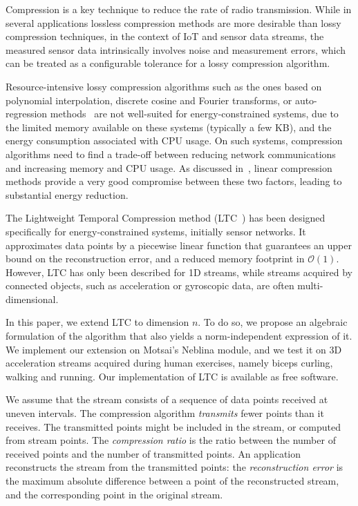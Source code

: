 \documentclass[10pt, conference, compsocconf]{IEEEtran}
\begin{document}
 Compression is a key technique to reduce the rate of radio 
 transmission.  While in several applications lossless compression 
 methods are more desirable than lossy compression techniques, in the 
 context of IoT and sensor data streams, the measured sensor data 
 intrinsically involves noise and measurement errors, which can 
 be treated as a configurable 
tolerance for a lossy compression algorithm. 

Resource-intensive lossy compression algorithms such as the ones based on 
polynomial interpolation, discrete cosine and Fourier transforms, or 
auto-regression methods~\cite{lu2010optimized} are not well-suited for 
energy-constrained systems, due to the limited memory available on 
these systems (typically a few KB), and the energy consumption 
associated with CPU usage. On such systems, compression algorithms need 
to find a trade-off between reducing network communications and 
increasing memory and CPU usage. As 
discussed in~\cite{zordan2014performance}, linear compression methods 
provide a very good compromise between these two factors, leading to 
substantial energy reduction.


The Lightweight Temporal Compression method 
(LTC~\cite{schoellhammer2004lightweight}) has been designed 
specifically for energy-constrained systems, initially sensor networks. 
It approximates data points by a piecewise linear function that 
guarantees an upper bound on the reconstruction error, and a reduced 
memory footprint in $\mathcal{O}(1)$. However, LTC has only been 
described for 1D streams, while streams acquired by connected objects, such as 
acceleration or gyroscopic data, are often multi-dimensional. 

In this paper, we extend LTC to dimension $n$. To do so, we propose an 
algebraic formulation of the algorithm that also yields a 
norm-independent expression of it. We implement our extension on 
Motsai's Neblina module, and we test it on 3D acceleration streams 
acquired during human exercises, namely biceps curling, walking and 
running. Our implementation of LTC is available as free software.

We assume that the stream consists of a sequence of data points 
received at uneven intervals. The compression algorithm 
\emph{transmits} fewer points than it receives. The transmitted points 
might be included in the stream, or computed from stream points. The 
\emph{compression ratio} is the ratio between the number of received 
points and the number of transmitted points. An application 
reconstructs the stream from the transmitted points: the 
\emph{reconstruction error} is the maximum absolute difference between 
a point of the reconstructed stream, and the corresponding 
point in the original stream.
\end{document}

